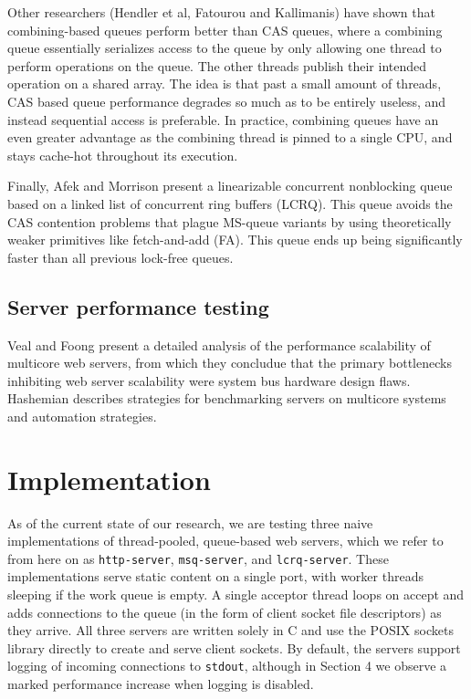 \documentclass[twoside]{article}
\begin{document}
\begin{multicols}{2}
Other researchers (Hendler et al, Fatourou and Kallimanis) have shown
that combining-based queues perform better than CAS queues, where a
combining queue essentially serializes access to the queue by only
allowing one thread to perform operations on the queue. The other
threads publish their intended operation on a shared array. The idea
is that past a small amount of threads, CAS based queue performance
degrades so much as to be entirely useless, and instead sequential
access is preferable. In practice, combining queues have an even
greater advantage as the combining thread is pinned to a single CPU,
and stays cache-hot throughout its execution.

Finally, Afek and Morrison present a linearizable concurrent
nonblocking queue based on a linked list of concurrent ring buffers
(LCRQ). This queue avoids the CAS contention problems that plague
MS-queue variants by using theoretically weaker primitives like
fetch-and-add (FA). This queue ends up being significantly faster than
all previous lock-free queues.

\subsection{Server performance testing}

Veal and Foong present a detailed analysis of the performance
scalability of multicore web servers, from which they concludue that
the primary bottlenecks inhibiting web server scalability were system
bus hardware design flaws. Hashemian describes strategies for
benchmarking servers on multicore systems and automation strategies.

\section{Implementation}
As of the current state of our research, we are testing three naive
implementations of thread-pooled, queue-based web servers, which we
refer to from here on as \verb+http-server+, \verb+msq-server+, and
\verb+lcrq-server+. These implementations serve static content on a
single port, with worker threads sleeping if the work queue is
empty. A single acceptor thread loops on accept and adds connections
to the queue (in the form of client socket file descriptors) as they
arrive. All three servers are written solely in C and use the POSIX
sockets library directly to create and serve client sockets. By
default, the servers support logging of incoming connections to
\verb+stdout+, although in Section 4 we observe a marked performance
increase when logging is disabled.


\end{multicols}
\end{document}
